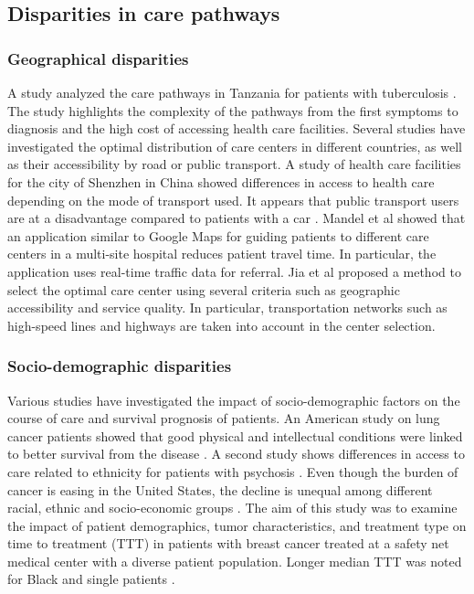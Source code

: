 \subsection{Disparities in care pathways}

\subsubsection{Geographical disparities}


A study analyzed the care pathways in Tanzania for patients with tuberculosis
\cite{mhalu_pathways_2019}. The study highlights the complexity of the pathways
from the first symptoms to diagnosis and the high cost of accessing health care
facilities. Several studies have investigated the optimal distribution of care
centers in different countries, as well as their accessibility by road or public
transport. A study of health care facilities for the city of Shenzhen in China
showed differences in access to health care depending on the mode of transport
used. It appears that public transport users are at a disadvantage compared to
patients with a car \cite{tao_spatial_2018}. Mandel et al
\cite{mandel_optimizing_2018} showed that an application similar to Google Maps
for guiding patients to different care centers in a multi-site hospital reduces
patient travel time. In particular, the application uses real-time traffic data
for referral. Jia et al \cite{jia_selecting_2014} proposed a method to select
the optimal care center using several criteria such as geographic accessibility
and service quality. In particular, transportation networks such as high-speed
lines and highways are taken into account in the center selection.

\subsubsection{Socio-demographic disparities}


Various studies have investigated the impact of socio-demographic factors on the
course of care and survival prognosis of patients. An American study on lung
cancer patients showed that good physical and intellectual conditions were
linked to better survival from the disease
\cite{pierzynski_socio-demographic_2018}. A second study shows differences in
access to care related to ethnicity for patients with psychosis
\cite{anderson_meta-analysis_2014}. Even though the burden of cancer is easing
in the United States, the decline is unequal among different racial, ethnic and
socio-economic groups \cite{viswanath_science_2005}. The aim of this study was
to examine the impact of patient demographics, tumor characteristics, and
treatment type on time to treatment (TTT) in patients with breast cancer treated
at a safety net medical center with a diverse patient population. Longer median
TTT was noted for Black and single patients \cite{khanna_impact_2017}.

